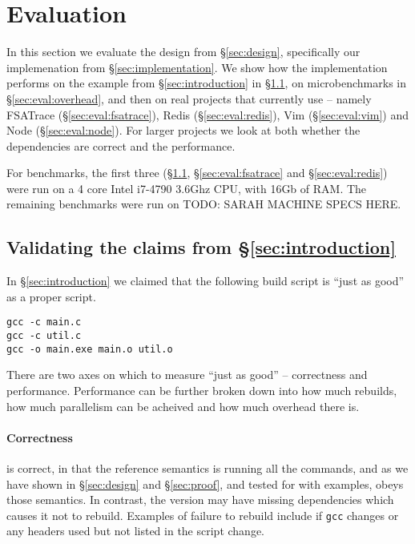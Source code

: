 \section{Evaluation}
\label{sec:evaluation}

In this section we evaluate the design from \S\ref{sec:design}, specifically our implemenation from \S\ref{sec:implementation}. We show how the implementation performs on the example from \S\ref{sec:introduction} in \S\ref{sec:eval:introduction}, on microbenchmarks in \S\ref{sec:eval:overhead}, and then on real projects that currently use \Make{} -- namely FSATrace (\S\ref{sec:eval:fsatrace}), Redis (\S\ref{sec:eval:redis}), Vim (\S\ref{sec:eval:vim}) and Node (\S\ref{sec:eval:node}). For larger projects we look at both whether the dependencies are correct and the performance.

For benchmarks, the first three (\S\ref{sec:eval:introduction}, \S\ref{sec:eval:fsatrace} and \S\ref{sec:eval:redis}) were run on a 4 core Intel i7-4790 3.6Ghz CPU, with 16Gb of RAM. The remaining benchmarks were run on TODO: SARAH MACHINE SPECS HERE.

\subsection{Validating the claims from \S\ref{sec:introduction}}
\label{sec:eval:introduction}

In \S\ref{sec:introduction} we claimed that the following build script is ``just as good'' as a proper \Make script.

\begin{verbatim}
gcc -c main.c
gcc -c util.c
gcc -o main.exe main.o util.o
\end{verbatim}

There are two axes on which to measure ``just as good'' -- correctness and performance. Performance can be further broken down into how much rebuilds, how much parallelism can be acheived and how much overhead there is.

\paragraph{Correctness} \Rattle is correct, in that the reference semantics is running all the commands, and as we have shown in \S\ref{sec:design} and \S\ref{sec:proof}, and tested for with examples, \Rattle obeys those semantics. In contrast, the \Make version may have missing dependencies which causes it not to rebuild. Examples of failure to rebuild include if \texttt{gcc} changes or any headers used but not listed in the \Make script change.

